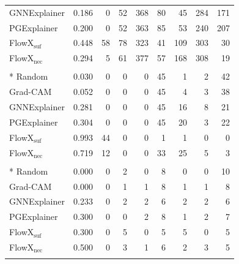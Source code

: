 {\begin{longtable}{@{}lrr rrr rrr@{}}
GNNExplainer & 0.186 & 0 & 52 & 368 & 80 & 45 & 284 & 171 \\
PGExplainer & 0.200 & 0 & 52 & 363 & 85 & 53 & 240 & 207 \\
FlowX$_{\mathrm{suf}}$ & 0.448 & 58 & 78 & 323 & 41 & 109 & 303 & 30 \\
FlowX$_{\mathrm{nec}}$ & 0.294 & 5 & 61 & 377 & 57 & 168 & 308 & 19 \\
\addlinespace
\multicolumn{9}{@{}l}{\textbf{ER-Infection} ($n=45$)}\\*
Random & 0.030 & 0 & 0 & 0 & 45 & 1 & 2 & 42 \\
Grad-CAM & 0.052 & 0 & 0 & 0 & 45 & 4 & 3 & 38 \\
GNNExplainer & 0.281 & 0 & 0 & 0 & 45 & 16 & 8 & 21 \\
PGExplainer & 0.304 & 0 & 0 & 0 & 45 & 20 & 3 & 22 \\
FlowX$_{\mathrm{suf}}$ & 0.993 & 44 & 0 & 0 & 1 & 1 & 0 & 0 \\
FlowX$_{\mathrm{nec}}$ & 0.719 & 12 & 0 & 0 & 33 & 25 & 5 & 3 \\
\addlinespace
\multicolumn{9}{@{}l}{\textbf{BA-Infection} ($n=10$)}\\*
Random & 0.000 & 0 & 2 & 0 & 8 & 0 & 0 & 10 \\
Grad-CAM & 0.000 & 0 & 1 & 1 & 8 & 1 & 1 & 8 \\
GNNExplainer & 0.233 & 0 & 2 & 2 & 6 & 2 & 2 & 6 \\
PGExplainer & 0.300 & 0 & 0 & 2 & 8 & 1 & 2 & 7 \\
FlowX$_{\mathrm{suf}}$ & 0.300 & 0 & 5 & 0 & 5 & 5 & 0 & 5 \\
FlowX$_{\mathrm{nec}}$ & 0.500 & 0 & 3 & 1 & 6 & 2 & 3 & 5 \\
\addlinespace
\end{longtable}
}

